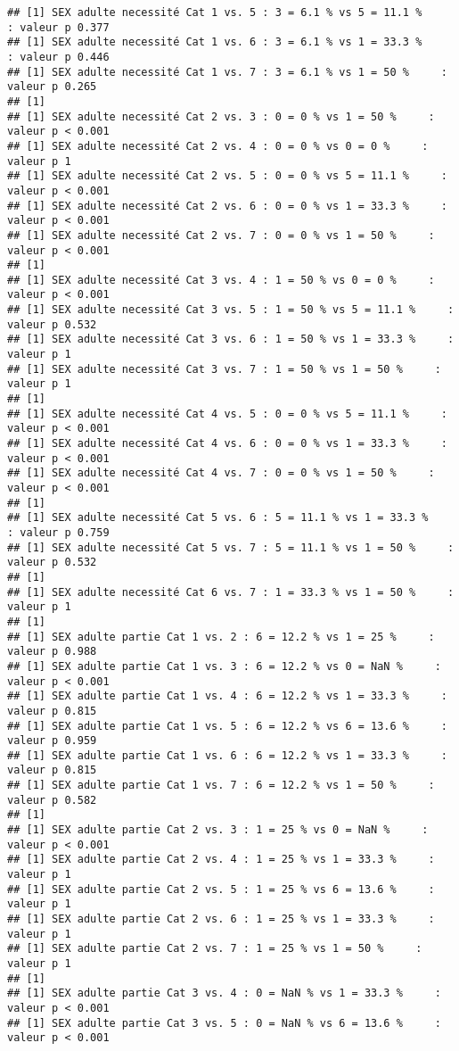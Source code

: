 \documentclass[
]{article}
\begin{document}
\begin{verbatim}
## [1] SEX adulte necessité Cat 1 vs. 5 : 3 = 6.1 % vs 5 = 11.1 %     : valeur p 0.377
## [1] SEX adulte necessité Cat 1 vs. 6 : 3 = 6.1 % vs 1 = 33.3 %     : valeur p 0.446
## [1] SEX adulte necessité Cat 1 vs. 7 : 3 = 6.1 % vs 1 = 50 %     : valeur p 0.265
## [1] 
## [1] SEX adulte necessité Cat 2 vs. 3 : 0 = 0 % vs 1 = 50 %     : valeur p < 0.001
## [1] SEX adulte necessité Cat 2 vs. 4 : 0 = 0 % vs 0 = 0 %     : valeur p 1
## [1] SEX adulte necessité Cat 2 vs. 5 : 0 = 0 % vs 5 = 11.1 %     : valeur p < 0.001
## [1] SEX adulte necessité Cat 2 vs. 6 : 0 = 0 % vs 1 = 33.3 %     : valeur p < 0.001
## [1] SEX adulte necessité Cat 2 vs. 7 : 0 = 0 % vs 1 = 50 %     : valeur p < 0.001
## [1] 
## [1] SEX adulte necessité Cat 3 vs. 4 : 1 = 50 % vs 0 = 0 %     : valeur p < 0.001
## [1] SEX adulte necessité Cat 3 vs. 5 : 1 = 50 % vs 5 = 11.1 %     : valeur p 0.532
## [1] SEX adulte necessité Cat 3 vs. 6 : 1 = 50 % vs 1 = 33.3 %     : valeur p 1
## [1] SEX adulte necessité Cat 3 vs. 7 : 1 = 50 % vs 1 = 50 %     : valeur p 1
## [1] 
## [1] SEX adulte necessité Cat 4 vs. 5 : 0 = 0 % vs 5 = 11.1 %     : valeur p < 0.001
## [1] SEX adulte necessité Cat 4 vs. 6 : 0 = 0 % vs 1 = 33.3 %     : valeur p < 0.001
## [1] SEX adulte necessité Cat 4 vs. 7 : 0 = 0 % vs 1 = 50 %     : valeur p < 0.001
## [1] 
## [1] SEX adulte necessité Cat 5 vs. 6 : 5 = 11.1 % vs 1 = 33.3 %     : valeur p 0.759
## [1] SEX adulte necessité Cat 5 vs. 7 : 5 = 11.1 % vs 1 = 50 %     : valeur p 0.532
## [1] 
## [1] SEX adulte necessité Cat 6 vs. 7 : 1 = 33.3 % vs 1 = 50 %     : valeur p 1
## [1] 
## [1] SEX adulte partie Cat 1 vs. 2 : 6 = 12.2 % vs 1 = 25 %     : valeur p 0.988
## [1] SEX adulte partie Cat 1 vs. 3 : 6 = 12.2 % vs 0 = NaN %     : valeur p < 0.001
## [1] SEX adulte partie Cat 1 vs. 4 : 6 = 12.2 % vs 1 = 33.3 %     : valeur p 0.815
## [1] SEX adulte partie Cat 1 vs. 5 : 6 = 12.2 % vs 6 = 13.6 %     : valeur p 0.959
## [1] SEX adulte partie Cat 1 vs. 6 : 6 = 12.2 % vs 1 = 33.3 %     : valeur p 0.815
## [1] SEX adulte partie Cat 1 vs. 7 : 6 = 12.2 % vs 1 = 50 %     : valeur p 0.582
## [1] 
## [1] SEX adulte partie Cat 2 vs. 3 : 1 = 25 % vs 0 = NaN %     : valeur p < 0.001
## [1] SEX adulte partie Cat 2 vs. 4 : 1 = 25 % vs 1 = 33.3 %     : valeur p 1
## [1] SEX adulte partie Cat 2 vs. 5 : 1 = 25 % vs 6 = 13.6 %     : valeur p 1
## [1] SEX adulte partie Cat 2 vs. 6 : 1 = 25 % vs 1 = 33.3 %     : valeur p 1
## [1] SEX adulte partie Cat 2 vs. 7 : 1 = 25 % vs 1 = 50 %     : valeur p 1
## [1] 
## [1] SEX adulte partie Cat 3 vs. 4 : 0 = NaN % vs 1 = 33.3 %     : valeur p < 0.001
## [1] SEX adulte partie Cat 3 vs. 5 : 0 = NaN % vs 6 = 13.6 %     : valeur p < 0.001

\end{verbatim}
\end{document}
